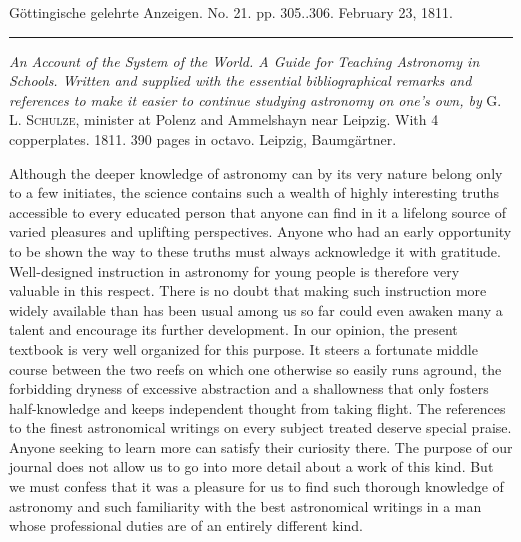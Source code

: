 \begin{center}\small Göttingische gelehrte Anzeigen. No. 21. pp. 305..306. February 23, 1811.\\[3pt]\rule{.72\linewidth}{.3pt}\end{center}

\emph{An Account of the System of the World. A Guide for Teaching Astronomy in Schools. Written and supplied with the essential bibliographical remarks and references to make it easier to continue studying astronomy on one's own, by} G. L. \textsc{Schulze}, minister at Polenz and Ammelshayn near Leipzig. With 4 copperplates. 1811. 390 pages in octavo. Leipzig, Baumgärtner.

Although the deeper knowledge of astronomy can by its very nature belong only to a few initiates, the science contains such a wealth of highly interesting truths accessible to every educated person that anyone can find in it a lifelong source of varied pleasures and uplifting perspectives. Anyone who had an early opportunity to be shown the way to these truths must always acknowledge it with gratitude. Well-designed instruction in astronomy for young people is therefore very valuable in this respect. There is no doubt that making such instruction more widely available than has been usual among us so far could even awaken many a talent and encourage its further development. In our opinion, the present textbook is very well organized for this purpose. It steers a fortunate middle course between the two reefs on which one otherwise so easily runs aground, the forbidding dryness of excessive abstraction and a shallowness that only fosters half-knowledge and keeps independent thought from taking flight. The references to the finest astronomical writings on every subject treated deserve special praise. Anyone seeking to learn more can satisfy their curiosity there. The purpose of our journal does not allow us to go into more detail about a work of this kind. But we must confess that it was a pleasure for us to find such thorough knowledge of astronomy and such familiarity with the best astronomical writings in a man whose professional duties are of an entirely different kind.
